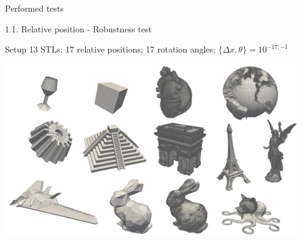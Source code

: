 \documentclass{beamer}
\begin{document}
\begin{frame}{Performed tests}
%
%    
%    
%
%
\end{frame}

\begin{frame}{1.1. Relative position - Robustness test}
  \begin{block}{Setup}
    13 STLs; 17 relative positions; 17 rotation angles;  $\{\Delta x, \theta\} = 10^{-17:-1}$
  \end{block}
  \includegraphics[width=0.95\textwidth]{matrix.pdf}
\end{frame}
\end{document}
